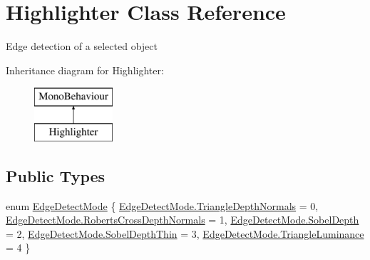 \hypertarget{class_highlighter}{}\section{Highlighter Class Reference}
\label{class_highlighter}


Edge detection of a selected object  


Inheritance diagram for Highlighter\+:\begin{figure}[H]
\begin{center}
\leavevmode
\includegraphics[height=2.000000cm]{class_highlighter}
\end{center}
\end{figure}
\subsection*{Public Types}
\begin{DoxyCompactItemize}
\item 
enum \mbox{\hyperlink{class_highlighter_a585a556fee5d14c362fbf2fada52a073}{Edge\+Detect\+Mode}} \{ \newline
\mbox{\hyperlink{class_highlighter_a585a556fee5d14c362fbf2fada52a073a7d24919ed28094f0202232ee6d708fa4}{Edge\+Detect\+Mode.\+Triangle\+Depth\+Normals}} = 0, 
\mbox{\hyperlink{class_highlighter_a585a556fee5d14c362fbf2fada52a073ac2b6fd3b6c9c392cd93579f3be952a8f}{Edge\+Detect\+Mode.\+Roberts\+Cross\+Depth\+Normals}} = 1, 
\mbox{\hyperlink{class_highlighter_a585a556fee5d14c362fbf2fada52a073acd3bd205137fb800eb3bb6533468dfe7}{Edge\+Detect\+Mode.\+Sobel\+Depth}} = 2, 
\mbox{\hyperlink{class_highlighter_a585a556fee5d14c362fbf2fada52a073a98e5dbe639f7850feb04dce03f5744ee}{Edge\+Detect\+Mode.\+Sobel\+Depth\+Thin}} = 3, 
\newline
\mbox{\hyperlink{class_highlighter_a585a556fee5d14c362fbf2fada52a073a1707b04c2953253bad60f979add23dea}{Edge\+Detect\+Mode.\+Triangle\+Luminance}} = 4
 \}
\end{DoxyCompactItemize}
